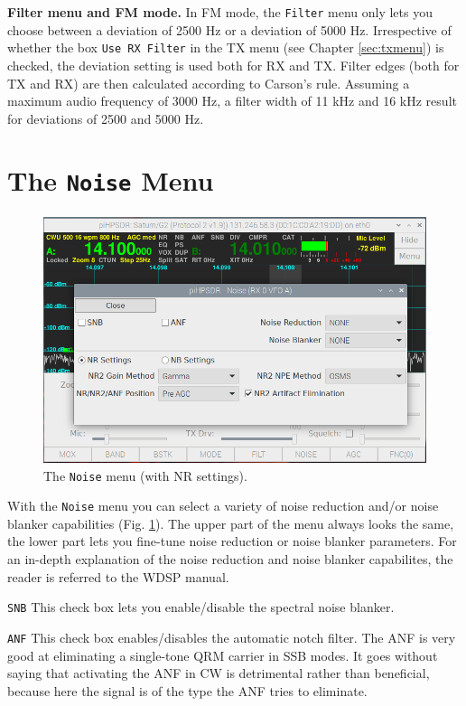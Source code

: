 \documentclass[12pt]{book}
\def\rett#1{\texttt{\color{red}#1}}
\def\bltt#1{\texttt{\color{blue}#1}}
\begin{document}
\textbf{Filter menu and FM mode.} In FM mode, the \bltt{Filter} menu only lets you
choose between a deviation of 2500 Hz or a deviation of 5000 Hz. 
Irrespective of whether the box \rett{Use RX Filter} in the TX menu (see
Chapter \ref{sec:txmenu}) is checked, the deviation setting is used both for RX and TX. 
Filter edges (both for
TX and RX) are then calculated according to Carson's rule. Assuming a maximum audio
frequency of 3000 Hz, a filter width of 11 kHz and 16 kHz result for deviations of 2500
and 5000 Hz.

\section{The \texttt{Noise} Menu}

\begin{figure}[ht]
\center
\includegraphics[width=12cm]{NoiseMenu1.png}
\caption{The \bltt{Noise} menu (with NR settings).}
\label{fig:NoiseMenu1}
\end{figure}

With the \bltt{Noise} menu you can select a variety of noise reduction and/or
noise blanker capabilities (Fig. \ref{fig:NoiseMenu1}). The upper part of the
menu always looks the same, the lower part lets you fine-tune noise reduction
or noise blanker parameters. For an in-depth explanation of the noise reduction
and noise blanker capabilites, the reader is referred to the WDSP manual.

\rett{SNB} This check box lets you enable/disable the spectral noise blanker.

\rett{ANF} This check box enables/disables the automatic notch filter. The ANF is
very good at eliminating a single-tone QRM carrier in SSB modes. It goes without
saying that activating the ANF in CW is detrimental rather than beneficial, because
here the signal is of the type the ANF tries to eliminate.
\end{document}
